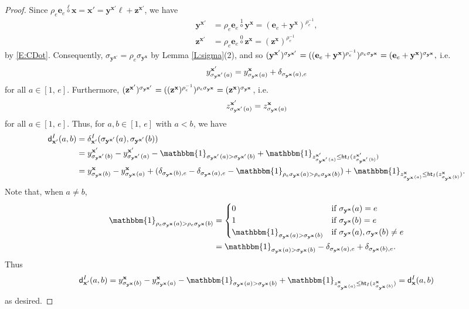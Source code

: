 \documentclass[11pt,a4paper,reqno]{amsart}
\numberwithin{equation}{section}
\theoremstyle{plain}
\theoremstyle{definition}
\theoremstyle{remark}
\numberwithin{equation}{section}
\newcommand{\bbone}{\mathbbm{1}}
\newcommand{\bx}{\mathbf{x}}
\newcommand{\by}{\mathbf{y}}
\newcommand{\bz}{\mathbf{z}}
\newcommand{\rr}{\rho}
\newcommand{\Be}{\mathbf{e}}
\newcommand{\CDot}[1]{\mathrel{\overset{#1}{\circ}}}
\newcommand{\Ht}{\mathsf{ht}}
\newcommand{\dd}{\mathsf{d}}
\begin{document}
\begin{proof}
Since $\rr_e\Be_{e}\CDot{\ell} \bx = \bx' = \by^{\bx'}\ell + \bz^{\bx'}$, we have
\begin{align*}
\by^{\bx'} &= \rr_e\Be_{e} \CDot{1} \by^{\bx} = (\Be_e + \by^{\bx})^{\rr_e^{-1}}, \\
\bz^{\bx'} &= \rr_e\Be_{e} \CDot{0} \bz^{\bx} = (\bz^{\bx})^{\rr_e^{-1}}
\end{align*}
by \eqref{E:CDot}.
Consequently, $\sigma_{\by^{\bx'}} = \rr_e \sigma_{\by^{\bx}}$ by Lemma \ref{L:sigma}(2), and
so
$
(\by^{\bx'})^{\sigma_{\by^{\bx\smash[t]{'}}}} = ( (\Be_e + \by^{\bx})^{\rr_e^{-1}} )^{\rr_e\sigma_{\by^{\bx}}} = (\Be_e + \by^{\bx})^{\sigma_{\by^{\bx}}},
$
i.e.\
$$
y^{\bx'}_{\sigma_{\by^{\bx\smash[t]{'}}}(a)} = y^{\bx}_{\sigma_{\by^{\bx}}(a)} + \delta_{\sigma_{\by^{\bx}}(a),e}
$$
for all $a \in [1,\,e]$.
Furthermore,
$(\bz^{\bx'})^{\sigma_{\by^{\bx\smash[t]{'}}}} = ((\bz^{\bx})^{\rr_e^{-1}})^{\rr_e\sigma_{\by^{\bx}}} = (\bz^{\bx})^{\sigma_{\by^{\bx}}}$, i.e.
$$
z^{\bx'}_{\sigma_{\by^{\bx\smash[t]{'}}}(a)} = z^{\bx}_{\sigma_{\by^{\bx}}(a)}
$$
for all $a \in [1,\,e]$.
Thus, for $a,b \in [1,\,e]$ with $a< b$, we have
\begin{align*}
\dd_{\bx'}^I(a,b) &= \delta_{\bx'}^I(\sigma_{\by^{\bx\smash[t]{'}}}(a), \sigma_{\by^{\bx\smash[t]{'}}}(b)) \\
&= y^{\bx'}_{\sigma_{{\by^{\bx\smash[t]{'}}}}(b)} - y^{\bx'}_{\sigma_{{\by^{\bx\smash[t]{'}}}}(a)} - \bbone_{\sigma_{\by^{\bx\smash[t]{'}}}(a) > \sigma_{\by^{\bx\smash[t]{'}}}(b)} +
\bbone_{z^{\bx'}_{\sigma_{\by^{\bx\smash[t]{'}}}(a)} \leq \Ht_I(z^{\bx'}_{\sigma_{\by^{\bx\smash[t]{'}}}(b)})} \\
&= y^{\bx}_{\sigma_{{\by^{\bx}}}(b)} - y^{\bx}_{\sigma_{{\by^{\bx}}}(a)} + (\delta_{\sigma_{\by^{\bx}}(b),e} - \delta_{\sigma_{\by^{\bx}}(a),e} - \bbone_{\rr_e\sigma_{\by^{\bx}}(a) > \rr_e\sigma_{\by^{\bx}}(b)}) +
\bbone_{z^{\bx}_{\sigma_{\by^{\bx}}(a)} \leq \Ht_I(z^{\bx}_{\sigma_{\by^{\bx}}(b)})}.
\end{align*}
Note that, when $a \ne b$,
\begin{align*}
\bbone_{\rr_e\sigma_{\by^{\bx}}(a) > \rr_e\sigma_{\by^{\bx}}(b)}
&=
\begin{cases}
0 &\text{if } \sigma_{\by^{\bx}}(a) = e \\
1 &\text{if } \sigma_{\by^{\bx}}(b) = e \\
\bbone_{\sigma_{\by^{\bx}}(a) > \sigma_{\by^{\bx}}(b)} &\text{if } \sigma_{\by^{\bx}}(a), \sigma_{\by^{\bx}}(b) \ne e
\end{cases} \\
&= \bbone_{\sigma_{\by^{\bx}}(a) > \sigma_{\by^{\bx}}(b)} - \delta_{\sigma_{\by^{\bx}}(a),e} + \delta_{\sigma_{\by^{\bx}}(b),e}.
\end{align*}
Thus
$$
\dd_{\bx'}^I(a,b) = y^{\bx}_{\sigma_{{\by^{\bx}}}(b)} - y^{\bx}_{\sigma_{{\by^{\bx}}}(a)} - \bbone_{\sigma_{\by^{\bx}}(a) > \sigma_{\by^{\bx}}(b)} +
\bbone_{z^{\bx}_{\sigma_{\by^{\bx}}(a)} \leq \Ht_I(z^{\bx}_{\sigma_{\by^{\bx}}(b)})} = \dd_{\bx}^I(a,b)
$$
as desired.
\end{proof}
\end{document}
